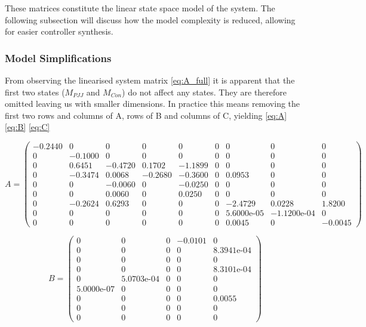 These matrices constitute the linear state space model of the system. The following subsection will discuss how the model complexity is reduced, allowing for easier controller synthesis.

\subsubsection{Model Simplifications}
From observing the linearised system matrix \cref{eq:A_full} it is apparent that the first two states ($M_{PJJ}$ and $M_{Con}$) do not affect any states. They are therefore omitted leaving us with smaller dimensions. In practice this means removing the first two rows and columns of A, rows of B and columns of C, yielding \cref{eq:A} \cref{eq:B} \cref{eq:C}

\begin{equation}  \label{eq:A}
	A = \left(\begin{array}{ccccccccc}
		-0.2440 & 0 & 0 & 0 & 0 & 0 & 0 & 0 & 0\\
		0 & -0.1000 & 0 & 0 & 0 & 0 & 0 & 0 & 0\\
		0 & 0.6451 & -0.4720 & 0.1702 & -1.1899 & 0 & 0 & 0 & 0\\
		0 & -0.3474 & 0.0068 & -0.2680 & -0.3600 & 0 & 0.0953 & 0 & 0\\
		0 & 0 & -0.0060 & 0 & -0.0250 & 0 & 0 & 0 & 0\\
		0 & 0 & 0.0060 & 0 & 0.0250 & 0 & 0 & 0 & 0\\
		0 & -0.2624 & 0.6293 & 0 & 0 & 0 & -2.4729 & 0.0228 & 1.8200\\
		0 & 0 & 0 & 0 & 0 & 0 & \text{5.6000e-05} & -\text{1.1200e-04} & 0\\
		0 & 0 & 0 & 0 & 0 & 0 & 0.0045 & 0 & -0.0045
	\end{array}\right)
\end{equation}

\begin{equation}  \label{eq:B}
	B = \left(\begin{array}{ccccc}
		0 & 0 & 0 & -0.0101 & 0\\
		0 & 0 & 0 & 0 & \text{8.3941e-04}\\
		0 & 0 & 0 & 0 & 0\\
		0 & 0 & 0 & 0 & \text{8.3101e-04}\\
		0 & \text{5.0703e-04} & 0 & 0 & 0\\
		\text{5.0000e-07} & 0 & 0 & 0 & 0\\
		0 & 0 & 0 & 0 & 0.0055\\
		0 & 0 & 0 & 0 & 0\\
		0 & 0 & 0 & 0 & 0
	\end{array}\right)
\end{equation}

